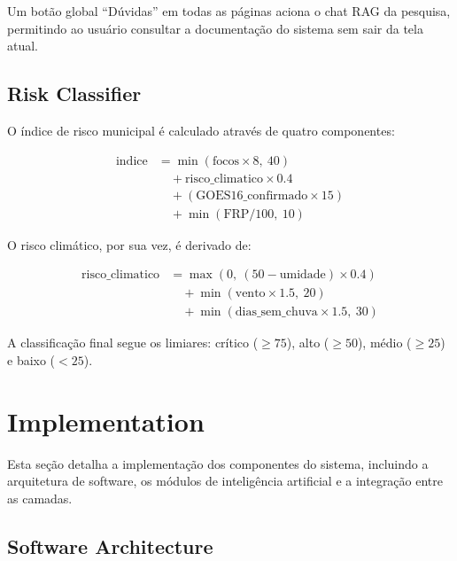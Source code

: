 \documentclass[preprint,times,numbers]{elsarticle}
\begin{document}
Um botão global ``Dúvidas'' em todas as páginas aciona o chat RAG da pesquisa, permitindo ao usuário consultar a documentação do sistema sem sair da tela atual.

\subsection{Risk Classifier}
\label{sec:risk}

O índice de risco municipal é calculado através de quatro componentes:

\begin{align}
\text{indice} &= \min(\text{focos} \times 8,\ 40) \nonumber \\
               &\quad + \text{risco\_climatico} \times 0.4 \nonumber \\
               &\quad + (\text{GOES16\_confirmado} \times 15) \nonumber \\
               &\quad + \min(\text{FRP} / 100,\ 10)
\end{align}

O risco climático, por sua vez, é derivado de:

\begin{align}
\text{risco\_climatico} &= \max(0,\ (50 - \text{umidade}) \times 0.4) \nonumber \\
                         &\quad + \min(\text{vento} \times 1.5,\ 20) \nonumber \\
                         &\quad + \min(\text{dias\_sem\_chuva} \times 1.5,\ 30)
\end{align}

A classificação final segue os limiares: crítico ($\ge 75$), alto ($\ge 50$), médio ($\ge 25$) e baixo ($< 25$).

\section{Implementation}
\label{sec:implementation}

Esta seção detalha a implementação dos componentes do sistema, incluindo a arquitetura de software, os módulos de inteligência artificial e a integração entre as camadas.

\subsection{Software Architecture}
\label{sec:sw-arch}
\end{document}
